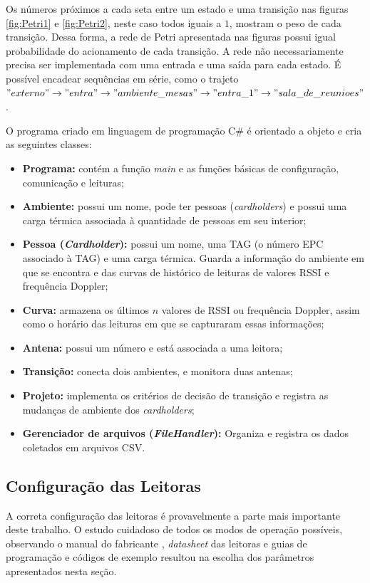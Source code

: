  Os números próximos a cada seta entre um estado e uma transição nas figuras \ref{fig:Petri1} e \ref{fig:Petri2}, neste caso todos iguais a $1$, mostram o peso de cada transição. Dessa forma, a rede de Petri apresentada nas figuras possui igual probabilidade do acionamento de cada transição. A rede não necessariamente precisa ser implementada com uma entrada e uma saída para cada estado. É possível encadear sequências em série, como o trajeto $"externo" \rightarrow "entra" \rightarrow "ambiente\_mesas" \rightarrow "entra\_1" \rightarrow "sala\_ de\_ reunioes"$.
 
 O programa criado em linguagem de programação C\# é orientado a objeto e cria as seguintes classes:
 
 \begin{itemize}
     \item \textbf{Programa:} contém a função \textit{main} e as funções básicas de configuração, comunicação e leituras;
     \item \textbf{Ambiente:} possui um nome, pode ter pessoas (\textit{cardholders}) e possui uma carga térmica associada à quantidade de pessoas em seu interior;
     \item \textbf{Pessoa (\textit{Cardholder}):} possui um nome, uma TAG (o número EPC associado à TAG) e uma carga térmica. Guarda a informação do ambiente em que se encontra e das curvas de histórico de leituras de valores RSSI e frequência Doppler;
     \item \textbf{Curva:} armazena os últimos $n$ valores de RSSI ou frequência Doppler, assim como o horário das leituras em que se capturaram essas informações;
     \item \textbf{Antena:} possui um número e está associada a uma leitora;
     \item \textbf{Transição:} conecta dois ambientes, e monitora duas antenas;
     \item \textbf{Projeto:} implementa os critérios de decisão de transição e registra as mudanças de ambiente dos \textit{cardholders};
     \item \textbf{Gerenciador de arquivos (\textit{FileHandler}):} Organiza e registra os dados coletados em arquivos CSV.
 \end{itemize}
 
 \subsection{Configuração das Leitoras}

  A correta configuração das leitoras é provavelmente a parte mais importante deste trabalho. O estudo cuidadoso de todos os modos de operação possíveis, observando o manual do fabricante \cite{SpeedwayRUserManual}, \textit{datasheet} das leitoras \cite{SpeedwayRDatasheet} e guias de programação e códigos de exemplo \cite{OctaneSDK} resultou na escolha dos parâmetros apresentados nesta seção.
  
